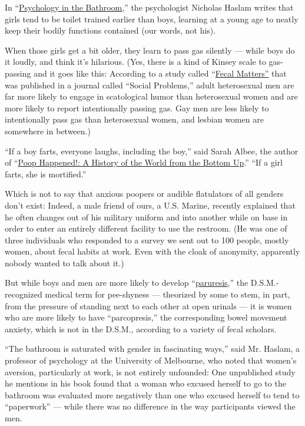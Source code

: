 In
``\href{https://www.amazon.com/Psychology-Bathroom-Nick-Haslam/dp/0230368255}{Psychology
in the Bathroom},'' the psychologist Nicholas Haslam writes that girls
tend to be toilet trained earlier than boys, learning at a young age to
neatly keep their bodily functions contained (our words, not his).

When those girls get a bit older, they learn to pass gas silently ---
while boys do it loudly, and think it's hilarious. (Yes, there is a kind
of Kinsey scale to gas-passing and it goes like this: According to a
study called
``\href{https://www.jstor.org/stable/10.1525/sp.2005.52.3.315?seq=1\#page_scan_tab_contents}{Fecal
Matters''} that was published in a journal called ``Social Problems,''
adult heterosexual men are far more likely to engage in scatological
humor than heterosexual women and are more likely to report
intentionally passing gas. Gay men are less likely to intentionally pass
gas than heterosexual women, and lesbian women are somewhere in
between.)

``If a boy farts, everyone laughs, including the boy,'' said Sarah
Albee, the author of
``\href{https://www.amazon.com/Poop-Happened-History-World-Bottom/dp/0802720773}{Poop
Happened!: A History of the World from the Bottom Up}.'' ``If a girl
farts, she is mortified.''

Which is not to say that anxious poopers or audible flatulators of all
genders don't exist: Indeed, a male friend of ours, a U.S. Marine,
recently explained that he often changes out of his military uniform and
into another while on base in order to enter an entirely different
facility to use the restroom. (He was one of three individuals who
responded to a survey we sent out to 100 people, mostly women, about
fecal habits at work. Even with the cloak of anonymity, apparently
nobody wanted to talk about it.)

But while boys and men are more likely to develop
``\href{https://www.ncbi.nlm.nih.gov/pubmed/24056834}{paruresis},'' the
D.S.M.-recognized medical term for pee-shyness --- theorized by some to
stem, in part, from the pressure of standing next to each other at open
urinals --- it is women who are more likely to have ``parcopresis,'' the
corresponding bowel movement anxiety, which is not in the D.S.M.,
according to a variety of fecal scholars.

``The bathroom is saturated with gender in fascinating ways,'' said Mr.
Haslam, a professor of psychology at the University of Melbourne, who
noted that women's aversion, particularly at work, is not entirely
unfounded: One unpublished study he mentions in his book found that a
woman who excused herself to go to the bathroom was evaluated more
negatively than one who excused herself to tend to ``paperwork'' ---
while there was no difference in the way participants viewed the men.

